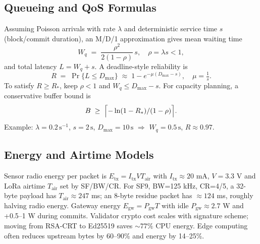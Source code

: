 \documentclass[12pt,onecolumn]{IEEEtran} %
\begin{document}
\subsection{Queueing and QoS Formulas}
Assuming Poisson arrivals with rate \(\lambda\) and deterministic service time \(s\) (block/commit duration), an M/D/1 approximation gives mean waiting time
\[
W_q \;=\; \frac{\rho^2}{2(1-\rho)}\,s,\quad \rho=\lambda s<1,
\]
and total latency \(L = W_q + s\). A deadline-style reliability is
\begin{equation}
R \;=\; \Pr\{L \le D_{\max}\} \;\approx\; 1 - e^{-\mu (D_{\max}-s)},\quad \mu=\tfrac{1}{s}.
\end{equation}
To satisfy \(R\ge R_\ast\), keep \(\rho<1\) and \(W_q \le D_{\max}-s\). For capacity planning, a conservative buffer bound is
\[
B \;\ge\; \Bigl\lceil -\ln(1-R_\ast)/(1-\rho)\Bigr\rceil.
\]
Example: \(\lambda=0.2\,\text{s}^{-1}\), \(s=2\,\text{s}\), \(D_{\max}=10\,\text{s}\) \(\Rightarrow\) \(W_q=0.5\,\text{s}\), \(R\approx0.97\).

\subsection{Energy and Airtime Models}
Sensor radio energy per packet is \(E_{\text{tx}} = I_{\text{tx}}VT_{\text{air}}\) with \(I_{\text{tx}}\!\approx\!20\) mA, \(V=3.3\) V and LoRa airtime \(T_{\text{air}}\) set by SF/BW/CR. For SF9, BW=125 kHz, CR=4/5, a 32-byte payload has \(T_{\text{air}}\approx247\) ms; an 8-byte residue packet has \(\approx124\) ms, roughly halving radio energy. Gateway energy \(E_{\text{gw}}=P_{\text{gw}}T\) with idle \(P_{\text{gw}}\approx2.7\) W and +0.5–1 W during commits. Validator crypto cost scales with signature scheme; moving from RSA-CRT to Ed25519 saves \(\sim77\%\) CPU energy. Edge computing often reduces upstream bytes by 60–90\% and energy by 14–25\%.
\end{document}
